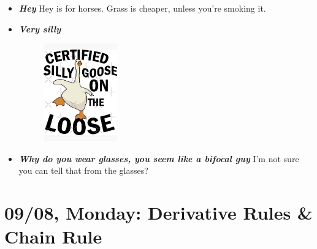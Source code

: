 \documentclass[11pt,letterpaper]{article}
\begin{document}
\begin{itemize}
\item {\bfseries\itshape Hey} Hey is for horses. Grass is cheaper, unless you're smoking it.

\item {\bfseries\itshape Very silly}
	\begin{figure}[H]
	\centering
	\includegraphics[width=0.30\textwidth]{images/goose.jpg}
	\end{figure}

\item {\bfseries\itshape Why do you wear glasses, you seem like a bifocal guy} I'm not sure you can tell that from the glasses? 
\end{itemize}

\newpage
\section*{09/08, Monday: Derivative Rules \& Chain Rule\label{09-08}}
\end{document}
